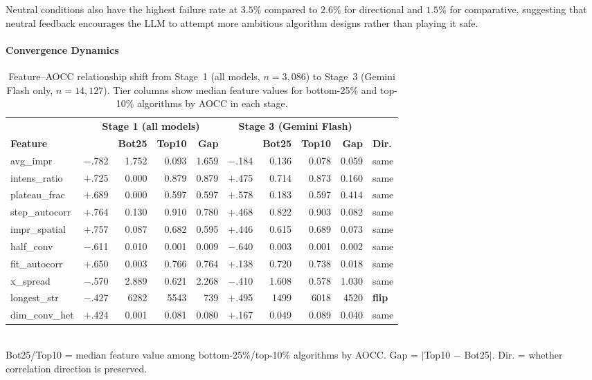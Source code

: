 Neutral conditions also have the highest failure rate at $3.5\%$ compared to $2.6\%$ for directional and $1.5\%$ for comparative, suggesting that neutral feedback encourages the LLM to attempt more ambitious algorithm designs rather than playing it safe.

\paragraph{Convergence Dynamics}
\label{sec:results-convergence}

\begin{table}[t]
\centering
\caption{Feature--AOCC relationship shift from Stage~1 (all models, $n{=}3{,}086$) to Stage~3 (Gemini Flash only, $n{=}14{,}127$). Tier columns show median feature values for bottom-25\% and top-10\% algorithms by AOCC in each stage.}
\label{tab:correlation-shift}
\footnotesize
\begin{tabular}{@{}l|rrrr|rrrr|l@{}}
\toprule
& \multicolumn{4}{c|}{\textbf{Stage 1 (all models)}} & \multicolumn{4}{c|}{\textbf{Stage 3 (Gemini Flash)}} & \\
\textbf{Feature} & \boldmath{$\rho$} & \textbf{Bot25} & \textbf{Top10} & \textbf{Gap} & \boldmath{$\rho$} & \textbf{Bot25} & \textbf{Top10} & \textbf{Gap} & \textbf{Dir.} \\
\midrule
avg\_impr       & $-$.782 & 1.752 & 0.093 & 1.659 & $-$.184 & 0.136 & 0.078 & 0.059 & same \\
intens\_ratio   & $+$.725 & 0.000 & 0.879 & 0.879 & $+$.475 & 0.714 & 0.873 & 0.160 & same \\
plateau\_frac   & $+$.689 & 0.000 & 0.597 & 0.597 & $+$.578 & 0.183 & 0.597 & 0.414 & same \\
step\_autocorr  & $+$.764 & 0.130 & 0.910 & 0.780 & $+$.468 & 0.822 & 0.903 & 0.082 & same \\
impr\_spatial   & $+$.757 & 0.087 & 0.682 & 0.595 & $+$.446 & 0.615 & 0.689 & 0.073 & same \\
half\_conv      & $-$.611 & 0.010 & 0.001 & 0.009 & $-$.640 & 0.003 & 0.001 & 0.002 & same \\
fit\_autocorr   & $+$.650 & 0.003 & 0.766 & 0.764 & $+$.138 & 0.720 & 0.738 & 0.018 & same \\
x\_spread       & $-$.570 & 2.889 & 0.621 & 2.268 & $-$.410 & 1.608 & 0.578 & 1.030 & same \\
longest\_str    & $-$.427 & 6282  & 5543  & 739   & $+$.495 & 1499  & 6018  & 4520  & \textbf{flip} \\
dim\_conv\_het  & $+$.424 & 0.001 & 0.081 & 0.080 & $+$.167 & 0.049 & 0.089 & 0.040 & same \\
\bottomrule
\end{tabular}
\\[0.3em]
{\scriptsize Bot25/Top10 = median feature value among bottom-25\%/top-10\% algorithms by AOCC. Gap = $|$Top10 $-$ Bot25$|$. Dir. = whether correlation direction is preserved.}
\end{table}

